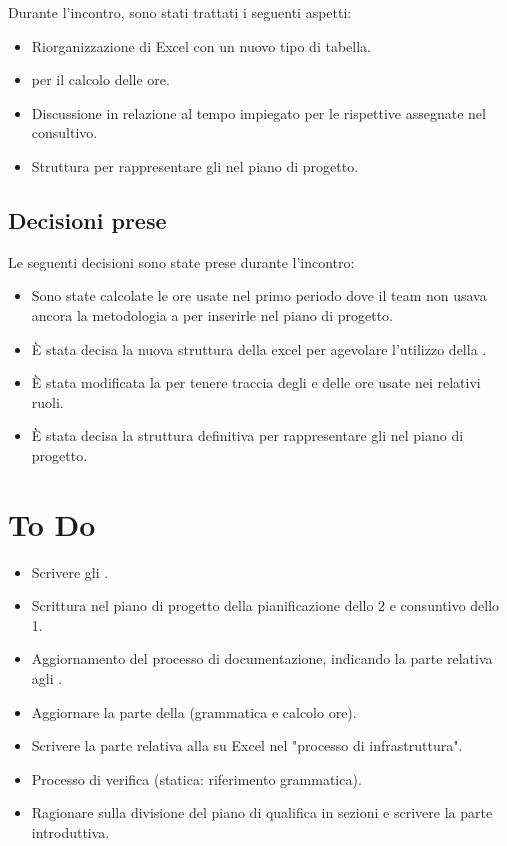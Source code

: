\documentclass[a4paper, 12pt]{article}
\begin{document}
Durante l'incontro, sono stati trattati i seguenti aspetti:
\begin{itemize}
    \item Riorganizzazione di Excel con un nuovo tipo di tabella.
    \item {} per il calcolo delle ore.
    \item Discussione in relazione al tempo impiegato per le rispettive  assegnate nel consultivo.
    \item Struttura per rappresentare gli  nel piano di progetto.
\end{itemize}

\subsection{Decisioni prese}

Le seguenti decisioni sono state prese durante l'incontro:
\begin{itemize}
    \item Sono state calcolate le ore usate nel primo periodo dove il team non usava ancora la metodologia a  per inserirle nel piano di progetto.
    \item È stata decisa la nuova struttura della  excel per agevolare l'utilizzo della .
    \item È stata modificata la  per tenere traccia degli  e delle ore usate nei relativi ruoli.
    \item È stata decisa la struttura definitiva per rappresentare gli  nel piano di progetto.
\end{itemize}

\section{To Do}
\begin{itemize}
    \item Scrivere gli .
    \item Scrittura nel piano di progetto della pianificazione dello  2 e consuntivo dello  1.
    \item Aggiornamento del processo di documentazione, indicando la parte relativa agli .
    \item Aggiornare la parte della  (grammatica e calcolo ore).
    \item Scrivere la parte relativa alla  su Excel nel "processo di infrastruttura".
    \item Processo di verifica (statica: riferimento  grammatica).
    \item Ragionare sulla divisione del piano di qualifica in sezioni e scrivere la parte introduttiva.
\end{itemize}
\end{document}
